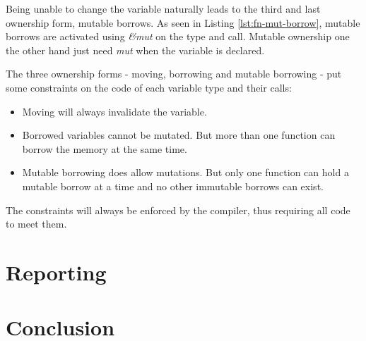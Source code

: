 \documentclass[a4paper,10pt]{article}
\begin{document}
Being unable to change the variable naturally leads to the third and last ownership form, mutable borrows. As seen in Listing \ref{lst:fn-mut-borrow}, mutable borrows are activated using \textit{\&mut } on the type and call. Mutable ownership one the other hand just need \textit{mut} when the variable is declared.

The three ownership forms - moving, borrowing and mutable borrowing - put some constraints on the code of each variable type and their calls:
\begin{itemize}
   \item Moving will always invalidate the variable.
   \item Borrowed variables cannot be mutated. But more than one function can borrow the memory at the same time.
   \item Mutable borrowing does allow mutations. But only one function can hold a mutable borrow at a time and no other immutable borrows can exist.
\end{itemize}

The constraints will always be enforced by the compiler, thus requiring all code to meet them.






\section{Reporting}

\section{Conclusion}




\end{document}
